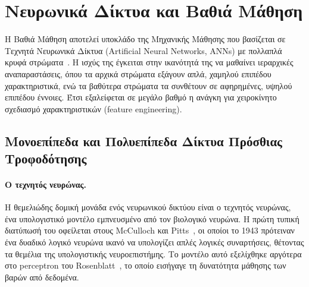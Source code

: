 \section{Νευρωνικά Δίκτυα και Βαθιά Μάθηση}
\label{sec:nn}

Η Βαθιά Μάθηση αποτελεί υποκλάδο
της Μηχανικής Μάθησης που βασίζεται σε Τεχνητά Νευρωνικά Δίκτυα
(Artificial Neural Networks, ANNs) με πολλαπλά
κρυφά στρώματα~\cite{goodfellow2016,lecun2015deeplearning}. Η ισχύς της
έγκειται στην ικανότητά της να μαθαίνει ιεραρχικές αναπαραστάσεις, όπου τα
αρχικά στρώματα εξάγουν απλά, χαμηλού επιπέδου χαρακτηριστικά, ενώ τα βαθύτερα
στρώματα τα συνθέτουν σε αφηρημένες, υψηλού επιπέδου έννοιες. Έτσι εξαλείφεται
σε μεγάλο βαθμό η ανάγκη για χειροκίνητο σχεδιασμό χαρακτηριστικών
(feature engineering).


\subsection{Μονοεπίπεδα και Πολυεπίπεδα Δίκτυα Πρόσθιας Τροφοδότησης}
\label{subsec:mlp}

\paragraph{Ο τεχνητός νευρώνας.}
Η θεμελιώδης δομική μονάδα ενός νευρωνικού δικτύου είναι ο τεχνητός νευρώνας,
ένα υπολογιστικό μοντέλο εμπνευσμένο από τον βιολογικό νευρώνα. Η πρώτη
τυπική διατύπωσή του οφείλεται στους McCulloch και Pitts~\cite{mcculloch1943},
οι οποίοι το 1943 πρότειναν ένα δυαδικό λογικό νευρώνα ικανό να υπολογίζει
απλές λογικές συναρτήσεις, θέτοντας τα θεμέλια της υπολογιστικής νευροεπιστήμης.
Το μοντέλο αυτό εξελίχθηκε αργότερα στο perceptron του
Rosenblatt~\cite{rosenblatt1958}, το οποίο εισήγαγε τη δυνατότητα μάθησης
των βαρών από δεδομένα.

